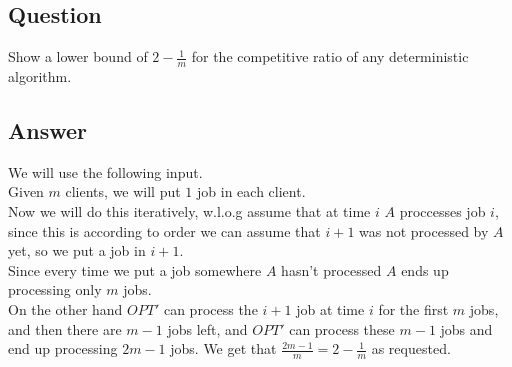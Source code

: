 \subsection*{Question}
Show a lower bound of $2 - \frac{1}{m}$ for the competitive ratio of any deterministic algorithm.
\subsection*{Answer}
We will use the following input.\\
Given $m$ clients, we will put $1$ job in each client.\\
Now we will do this iteratively, w.l.o.g assume that at time $i$ $A$ proccesses job $i$, since this is according to order we can assume that $i+1$ was not processed by $A$ yet, so we put a job in $i+1$.\\
Since every time we put a job somewhere $A$ hasn't processed $A$ ends up processing only $m$ jobs.\\
On the other hand $OPT'$ can process the $i+1$ job at time $i$ for the first $m$ jobs, and then there are $m-1$ jobs left, and $OPT'$ can process these $m-1$ jobs and end up processing $2m-1$ jobs. We get that $\frac{2m-1}{m} = 2-\frac{1}{m}$ as requested.